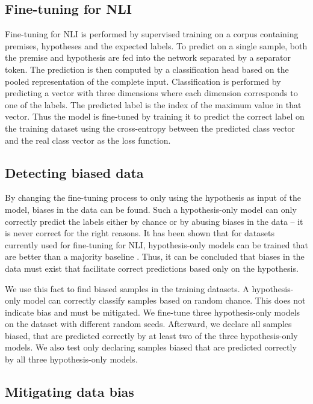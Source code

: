 \subsection{Fine-tuning for \acs{NLI}}

Fine-tuning for \acs{NLI} is performed by supervised training on a corpus containing premises, hypotheses and the expected labels. To predict on a single sample, both the premise and hypothesis are fed into the network separated by a separator token. The prediction is then computed by a classification head based on the pooled representation of the complete input. Classification is performed by predicting a vector with three dimensions where each dimension corresponds to one of the labels. The predicted label is the index of the maximum value in that vector. Thus the model is fine-tuned by training it to predict the correct label on the training dataset using the cross-entropy between the predicted class vector and the real class vector as the loss function.

\subsection{Detecting biased data}

By changing the fine-tuning process to only using the hypothesis as input of the model, biases in the data can be found. Such a hypothesis-only model can only correctly predict the labels either by chance or by abusing biases in the data -- it is never correct for the right reasons. It has been shown that for datasets currently used for fine-tuning for \acs{NLI}, hypothesis-only models can be trained that are better than a majority baseline \citep{hyponly}. Thus, it can be concluded that biases in the data must exist that facilitate correct predictions based only on the hypothesis.

We use this fact to find biased samples in the training datasets. A hypothesis-only model can correctly classify samples based on random chance. This does not indicate bias and must be mitigated. We fine-tune three hypothesis-only models on the dataset with different random seeds. Afterward, we declare all samples biased, that are predicted correctly by at least two of the three hypothesis-only models. We also test only declaring samples biased that are predicted correctly by all three hypothesis-only models.


\subsection{Mitigating data bias}

